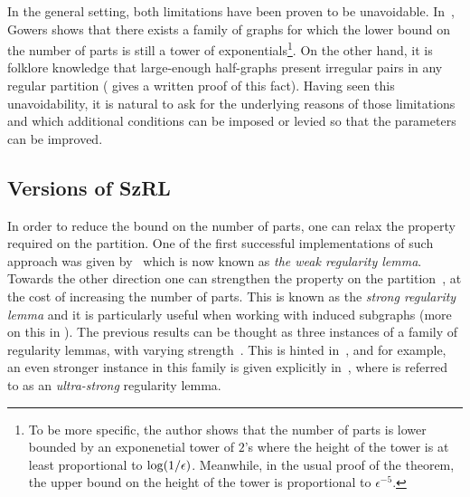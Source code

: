         In the general setting, both limitations have been proven to be unavoidable.
        In~\cite{lower_bounds_of_tower_type_for_szeremedis_uniformity_lemma}, Gowers shows that there exists a family of graphs
        for which the lower bound on the number of parts is still a tower of exponentials\footnote{
        To be more specific, the author shows that the number of parts is lower bounded by an exponenetial tower of $2$'s where
            the height of the tower is at least proportional to $\log( 1/\epsilon )$.
            Meanwhile, in the usual proof of the theorem, the upper bound on the height of the tower is proportional to
            $\epsilon^{-5}$.
        }.
        On the other hand, it is folklore knowledge that large-enough half-graphs present irregular pairs in any
        regular partition (\cite{irregular_pairs_in_half_graphs_szemeredi_regularity} gives a written proof of this fact).
        Having seen this unavoidability, it is natural to ask for the underlying reasons of those limitations and which
        additional conditions can be imposed or levied so that the parameters can be improved.

    \subsection{Versions of SzRL}

        In order to reduce the bound on the number of parts, one can relax the property required on the partition.
        One of the first successful implementations of such approach was given
        by~\cite[Theorem 12]{quick_approximation_to_matrices_and_applications} which is now known as
        \emph{the weak regularity lemma}.
        Towards the other direction one can strengthen the property on the
        partition~\cite[Lemma 4.1]{efficient_testing_of_large_graphs}, at the cost of increasing the number of parts.
        This is known as the \emph{strong regularity lemma} and it is particularly useful when working with induced
        subgraphs (more on this in ).
        The previous results can be thought as three instances of a family of regularity lemmas, with varying
        strength~\cite{regularity_partitions_and_the_topology_of_graphons, szemeredis_lemma_for_the_analyst}.
        This is hinted in~\cite[Lemma 4.1 and its discussion]{szemeredis_lemma_for_the_analyst}, and for example, an even
        stronger instance in this family is given explicitly in~\cite[Section 5.1 - pg. 439]{regularity_partitions_and_the_topology_of_graphons},
        where is referred to as an \emph{ultra-strong} regularity lemma.

